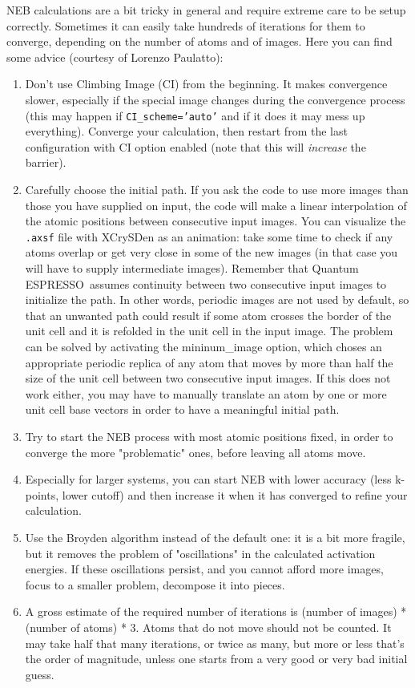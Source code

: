 \documentclass[12pt,a4paper]{article}
\def\qe{{\sc Quantum ESPRESSO}}
\begin{document}
NEB calculations are a bit tricky in general and require extreme care to be
setup correctly. Sometimes it can easily take hundreds of iterations for them
 to converge, depending on the number of atoms and of images. 
Here you can find some advice (courtesy of Lorenzo Paulatto):
\begin{enumerate}
\item 
Don't use Climbing Image (CI) from the beginning. It makes convergence slower, 
especially if the special image changes during the convergence process (this 
may happen if \texttt{CI\_scheme='auto'} and if it does it may mess up everything).
Converge your calculation, then restart from the last configuration with
CI option enabled (note that this will {\em increase} the barrier).
\item
Carefully choose the initial path. 
If you ask the code to use more images than those you have supplied on input,
the code will make a linear interpolation of the atomic positions between
consecutive input images.
You can visualize the \texttt{.axsf} file with XCrySDen as an animation:
 take some time to check if any atoms overlap or get very close in some
of the new images (in that case you will have to supply intermediate images).
Remember that \qe\ assumes continuity between two consecutive input images
 to initialize the path. In other words, periodic images are not used 
by default, so that an unwanted path could result if some atom crosses the 
border of the unit cell and it is refolded in the unit cell in the input image.
The problem can be solved by activating the mininum\_image option, which choses
an appropriate periodic replica of any atom that moves by more than half the
size of the unit cell between two consecutive input images.
If this does not work either, you may have to manually translate an atom by
one or more unit cell base vectors in order to have a meaningful initial path. 
\item
Try to start the NEB process with most atomic positions fixed, 
in order to converge the more "problematic" ones, before leaving
all atoms move.
\item
Especially for larger systems, you can start NEB with lower accuracy 
(less k-points, lower cutoff) and then increase it when it has
converged to refine your calculation.
\item
Use the Broyden algorithm instead of the default one: it is a bit more
fragile, but it removes the problem of "oscillations" in the calculated
activation energies. If these oscillations persist, and you cannot afford 
more images, focus to a smaller problem, decompose it into pieces.
\item
A gross estimate of the required number of iterations is
(number of images) * (number of atoms) * 3. Atoms that do not
move should not be counted. It may take half that many iterations, 
or twice as many, but more or less that's the order of magnitude, 
unless one starts from a very good or very bad initial guess.
\end{enumerate}
\end{document}
